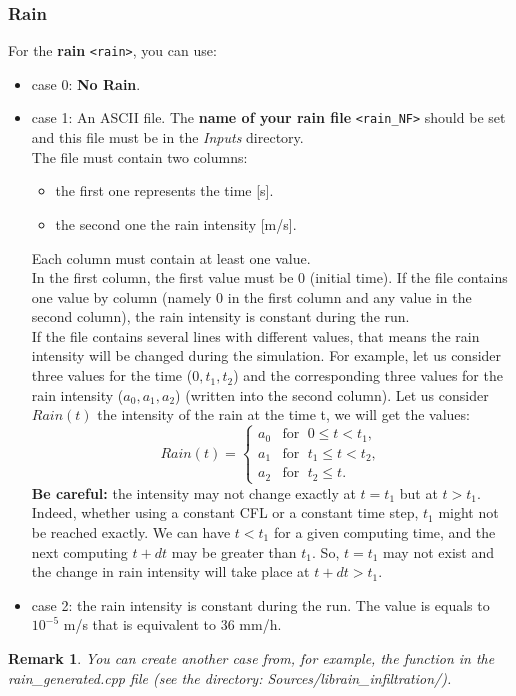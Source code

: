 \documentclass[a4paper, 11pt]{article}
\newtheorem{rmk}{Remark}
\begin{document}
\subsubsection{Rain}
For the \textbf{rain} \texttt{<rain>}, you can use:
\begin{itemize}
\item case 0: \textbf{No Rain}.
\item case 1: An ASCII file.
  The \textbf{name of your rain file} \texttt{<rain\_NF>} should be set and this file must be in the \textit{Inputs} directory.\\
  The file must contain two columns:
  \begin{itemize}
  \item the first one represents the time [s].
  \item the second one the rain intensity [m/s].
  \end{itemize}
  Each column must contain at least one value.\\
  In the first column, the first value must be 0 (initial time). If the file contains one value by column (namely 0 in the first column and any value in the second column), the rain intensity is constant during the run.\\
  If the file contains several lines with different values, that means the rain intensity will be changed during the simulation.
  For example, let us consider three values for the time ($0,t_1,t_2$) and the corresponding three values for the rain intensity ($a_0,a_1,a_2$) (written into the second column). Let us consider $Rain(t)$ the intensity of the rain at the time t, we will get the values:
  $$Rain(t)=\left\{\begin{array}{rl}
  {a_0} & \mbox{for }\; 0 \leq t < t_1,\\
  {a_1} & \mbox{for }\; t_1 \leq t < t_2, \\
  {a_2} & \mbox{for }\; t_2 \leq t. \end{array}\right.$$
  \textbf{Be careful:} the intensity may not change exactly at $t=t_1$ but at $t > t_1$. Indeed, whether using a constant CFL or a constant time step, $t_1$ might not be reached exactly. We can have $t<t_1$ for a given computing time, and the next computing $t+dt$ may be greater than $t_1$. So, $t=t_1$ may not exist and the change in rain intensity will take place at $t+dt>t_1$.
  
\item case 2: the rain intensity is constant during the run. The value is equals to $10^{-5} $ m/s that is equivalent to $36$ mm/h.  
\end{itemize}
\begin{rmk}
You can create another case from, for example, the function in the rain\_generated.cpp file (see the directory: Sources/librain\_infiltration/).
\end{rmk}
\end{document}

